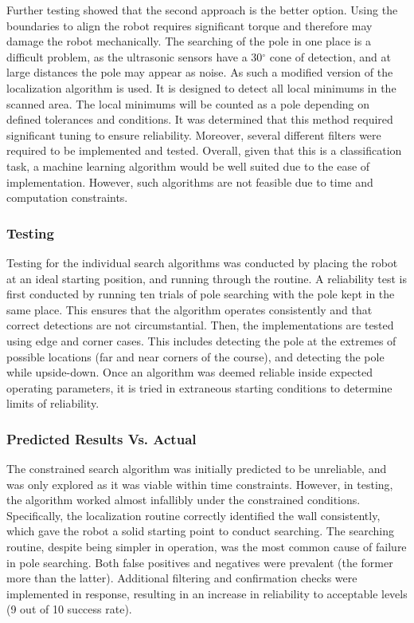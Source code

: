 \documentclass[ece]{uw-wkrpt}
\begin{document}
Further testing showed that the second approach is the better option. Using the boundaries to align the robot requires significant torque and therefore may damage the robot mechanically. The searching of the pole in one place is a difficult problem, as the ultrasonic sensors have a 30$^{\circ}$ cone of detection, and at large distances the pole may appear as noise. As such a modified version of the localization algorithm is used. It is designed to detect all local minimums in the scanned area. The local minimums will be counted as a pole depending on defined tolerances and conditions. It was determined that this method required significant tuning to ensure reliability. Moreover, several different filters were required to be implemented and tested. Overall, given that this is a classification task, a machine learning algorithm would be well suited due to the ease of implementation. However, such algorithms are not feasible due to time and computation constraints.

\subsubsection{Testing}

Testing for the individual search algorithms was conducted by placing the robot at an ideal starting position, and running through the routine. A reliability test is first conducted by running ten trials of pole searching with the pole kept in the same place. This ensures that the algorithm operates consistently and that correct detections are not circumstantial. Then, the implementations are tested using edge and corner cases. This includes detecting the pole at the extremes of possible locations (far and near corners of the course), and detecting the pole while upside-down. Once an algorithm was deemed reliable inside expected operating parameters, it is tried in extraneous starting conditions to determine limits of reliability. 

\subsubsection{Predicted Results Vs. Actual}

The constrained search algorithm was initially predicted to be unreliable, and was only explored as it was viable within time constraints. However, in testing, the algorithm worked almost infallibly under the constrained conditions. Specifically, the localization routine correctly identified the wall consistently, which gave the robot a solid starting point to conduct searching. The searching routine, despite being simpler in operation, was the most common cause of failure in pole searching. Both false positives and negatives were prevalent (the former more than the latter). Additional filtering and confirmation checks were implemented in response, resulting in an increase in reliability to acceptable levels (9 out of 10 success rate). 
\end{document}
